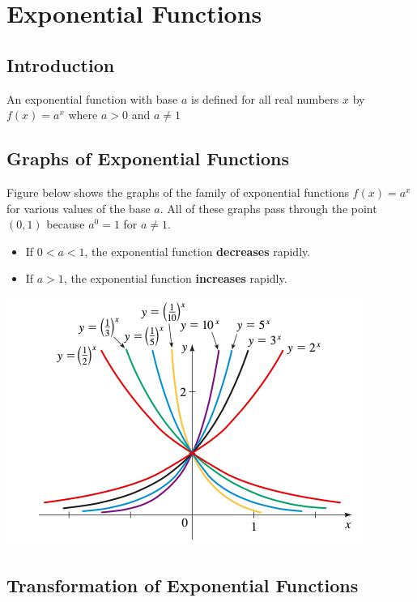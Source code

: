 \documentclass{book}
\begin{document}
	\chapter{Exponential Functions}
	
	
	\section{Introduction}
	\begin{mdframed}[backgroundcolor=yellow]
		An exponential function with base $a$ is defined for all real numbers $x$ by $f(x) = a^x$ where $a>0$ and $a \neq 1$
	\end{mdframed}
	
	\section{Graphs of Exponential Functions}
	 Figure below shows the graphs of the family of exponential functions $f(x) = a^x$ for various values of the base $a$. All of these graphs pass through the point $(0,1)$ because $a^0 = 1$ for $a \neq 1$.
	 
	 \begin{itemize}
	 	\item If $0<a<1$, the exponential function \textbf{decreases} rapidly.
	 	\item If $a>1$, the exponential function \textbf{increases} rapidly.
	 \end{itemize}
	 
	 \includegraphics[scale=1.0]{expgraph}
	
	\section{Transformation of Exponential Functions}
\end{document}
